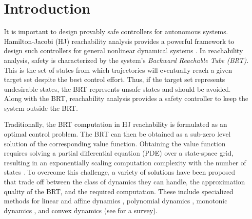 \section{Introduction}

It is important to design provably safe controllers for autonomous systems. 
Hamilton-Jacobi (HJ) reachability analysis provides a powerful framework to design such controllers for general nonlinear dynamical systems \citep{lygeros2004reachability, mitchell2005time}.
In reachability analysis, safety is characterized by the system's \textit{Backward Reachable Tube (BRT)}.
This is the set of states from which trajectories will eventually reach a given target set despite the best control effort.
Thus, if the target set represents undesirable states, the BRT represents unsafe states and should be avoided. 
Along with the BRT, reachability analysis provides a safety controller to keep the system outside the BRT. 

Traditionally, the BRT computation in HJ reachability is formulated as an optimal control problem.
The BRT can then be obtained as a sub-zero level solution of the corresponding value function.
Obtaining the value function requires solving a partial differential equation (PDE) over a state-space grid, resulting in an exponentially scaling computation complexity with the number of states \citep{bansal2017hamilton}.
To overcome this challenge, a variety of solutions have been proposed that trade off between the class of dynamics
they can handle, the approximation quality of the BRT,
and the required computation.
These include specialized methods for linear and affine dynamics \citep{10.1007/3-540-64358-3_38, Frehse2011, Kurzhanski00, Kurzhanski02, Maidens13, girard2005reachability, althoff2010computing, bak2019numerical, Nilsson2016}, polynomial dynamics \citep{doi:10.1177/0278364914528059, majumdar2017funnel, Dreossi16, henrion2014convex}, monotonic dynamics \citep{coogan2015efficient}, and convex dynamics \citep{chow2017algorithm}
(see \citet{bansal2017hamilton, bansal2021deepreach} for a survey).

